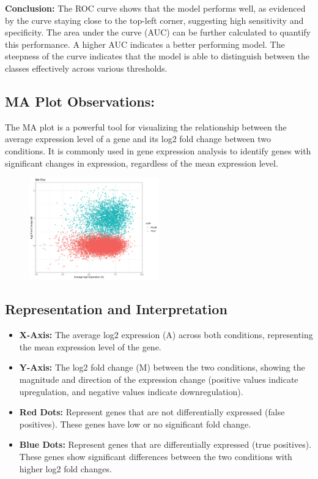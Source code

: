 \documentclass[12pt]{article}
\begin{document}
\textbf{Conclusion:} The ROC curve shows that the model performs well, as evidenced by the curve staying close to the top-left corner, suggesting high sensitivity and specificity. The area under the curve (AUC) can be further calculated to quantify this performance. A higher AUC indicates a better performing model. The steepness of the curve indicates that the model is able to distinguish between the classes effectively across various thresholds.



\subsection{MA Plot Observations:} The MA plot is a powerful tool for visualizing the relationship between the average expression level of a gene and its log2 fold change between two conditions. It is commonly used in gene expression analysis to identify genes with significant changes in expression, regardless of the mean expression level.

\begin{figure}[h]
  \centering
  \includegraphics[width=0.5\textwidth]{figure/MA.png}  %
\end{figure}

\subsection*{Representation and Interpretation}
\begin{itemize}
  \item \textbf{X-Axis:} The average log2 expression (A) across both conditions, representing the mean expression level of the gene.
  \item \textbf{Y-Axis:} The log2 fold change (M) between the two conditions, showing the magnitude and direction of the expression change (positive values indicate upregulation, and negative values indicate downregulation).
  \item \textbf{Red Dots:} Represent genes that are not differentially expressed (false positives). These genes have low or no significant fold change.
  \item \textbf{Blue Dots:} Represent genes that are differentially expressed (true positives). These genes show significant differences between the two conditions with higher log2 fold changes.
\end{itemize}
\end{document}
